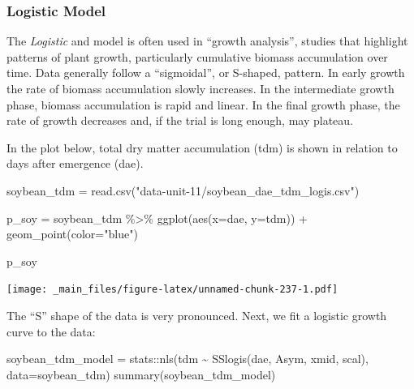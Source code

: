 \documentclass[
]{book}
\newenvironment{Shaded}{\begin{snugshade}}{\end{snugshade}}
\newcommand{\AttributeTok}[1]{\textcolor[rgb]{0.77,0.63,0.00}{#1}}
\newcommand{\FunctionTok}[1]{\textcolor[rgb]{0.00,0.00,0.00}{#1}}
\newcommand{\NormalTok}[1]{#1}
\newcommand{\OtherTok}[1]{\textcolor[rgb]{0.56,0.35,0.01}{#1}}
\newcommand{\SpecialCharTok}[1]{\textcolor[rgb]{0.00,0.00,0.00}{#1}}
\newcommand{\StringTok}[1]{\textcolor[rgb]{0.31,0.60,0.02}{#1}}
\begin{document}
\hypertarget{logistic-model}{%
\subsubsection{Logistic Model}\label{logistic-model}}

The \emph{Logistic} and model is often used in ``growth analysis'', studies that highlight patterns of plant growth, particularly cumulative biomass accumulation over time. Data generally follow a ``sigmoidal'', or S-shaped, pattern. In early growth the rate of biomass accumulation slowly increases. In the intermediate growth phase, biomass accumulation is rapid and linear. In the final growth phase, the rate of growth decreases and, if the trial is long enough, may plateau.

In the plot below, total dry matter accumulation (tdm) is shown in relation to days after emergence (dae).

\begin{Shaded}
\begin{Highlighting}[]
\NormalTok{soybean\_tdm }\OtherTok{=} \FunctionTok{read.csv}\NormalTok{(}\StringTok{"data{-}unit{-}11/soybean\_dae\_tdm\_logis.csv"}\NormalTok{)}

\NormalTok{p\_soy }\OtherTok{=}\NormalTok{ soybean\_tdm }\SpecialCharTok{\%\textgreater{}\%}
  \FunctionTok{ggplot}\NormalTok{(}\FunctionTok{aes}\NormalTok{(}\AttributeTok{x=}\NormalTok{dae, }\AttributeTok{y=}\NormalTok{tdm)) }\SpecialCharTok{+}
  \FunctionTok{geom\_point}\NormalTok{(}\AttributeTok{color=}\StringTok{"blue"}\NormalTok{)}

\NormalTok{p\_soy}
\end{Highlighting}
\end{Shaded}

\texttt{[image: \_main\_files/figure-latex/unnamed-chunk-237-1.pdf]}

The ``S'' shape of the data is very pronounced. Next, we fit a logistic growth curve to the data:

\begin{Shaded}
\begin{Highlighting}[]
\NormalTok{soybean\_tdm\_model }\OtherTok{=}\NormalTok{ stats}\SpecialCharTok{::}\FunctionTok{nls}\NormalTok{(tdm }\SpecialCharTok{\textasciitilde{}} \FunctionTok{SSlogis}\NormalTok{(dae, Asym, xmid, scal), }\AttributeTok{data=}\NormalTok{soybean\_tdm)}
\FunctionTok{summary}\NormalTok{(soybean\_tdm\_model)}
\end{Highlighting}
\end{Shaded}
\end{document}
